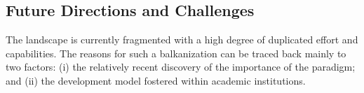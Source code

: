 \documentclass{sig-alternate}
\begin{document}






%
\subsection{Future Directions and Challenges}
\label{sec:future}

The \pilot landscape is currently fragmented with a high degree of duplicated
effort and capabilities. The reasons for such a balkanization can be traced
back mainly to two factors: (i) the relatively recent discovery of the
importance of the \pilot paradigm; and (ii) the development model fostered
within academic institutions.
\end{document}
